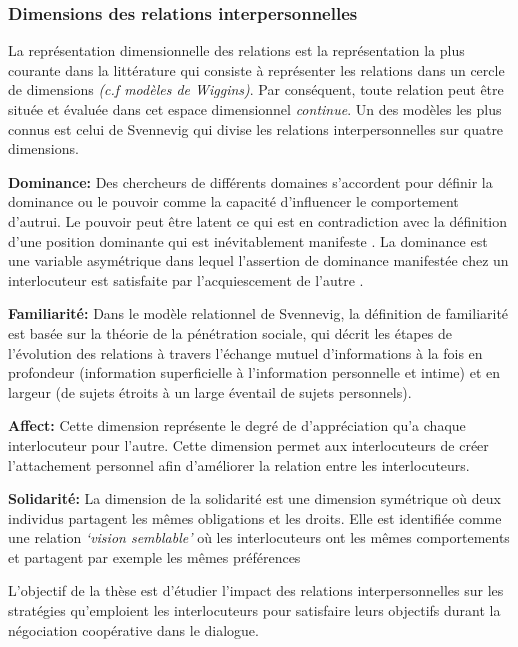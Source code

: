 \documentclass[a4paper,french]{article}
\begin{document}
\subsubsection{Dimensions des relations interpersonnelles}
La représentation dimensionnelle des relations est la représentation la plus courante dans la littérature qui consiste à représenter les relations dans un cercle de dimensions \emph{(c.f modèles de Wiggins)}. Par conséquent, toute relation peut être située et évaluée dans cet espace dimensionnel \textit{continue}. Un des modèles les plus connus est celui de Svennevig \cite{svennevig2000getting} qui divise les relations interpersonnelles sur quatre dimensions. 
\par \textbf{Dominance:} Des chercheurs de différents domaines s'accordent pour définir la dominance ou le pouvoir comme la capacité d'influencer le comportement d'autrui. Le pouvoir peut être latent \cite{komter1989hidden} ce qui est en contradiction avec la définition d'une position dominante qui est inévitablement manifeste \cite{dunbar2005perceptions}. La dominance est une variable asymétrique dans lequel l'assertion de dominance manifestée chez un interlocuteur est satisfaite par l'acquiescement de l'autre \cite{rogers1979domineeringness}.

\par \textbf{Familiarité:} Dans le modèle relationnel de Svennevig, la définition de familiarité est basée sur la théorie de la pénétration sociale, qui décrit les étapes de l'évolution des relations à travers l'échange mutuel d'informations à la fois en profondeur (information superficielle à l'information personnelle et intime) et en largeur (de sujets étroits à un large éventail de sujets personnels).

\par \textbf{Affect:} Cette dimension représente le degré de d'appréciation qu'a chaque interlocuteur pour l'autre. Cette dimension permet aux interlocuteurs de créer l'attachement personnel afin d'améliorer la relation entre les interlocuteurs\cite{nicholson2001role}.
	
\par \textbf{Solidarité:} La dimension de la solidarité est une dimension symétrique où deux individus partagent les mêmes obligations et les droits. Elle est identifiée comme une  relation  \emph{‘vision semblable’} où les interlocuteurs ont les mêmes comportements et partagent par exemple les mêmes préférences

\par L'objectif de la thèse est d'étudier l'impact des relations interpersonnelles sur les stratégies qu'emploient les interlocuteurs pour satisfaire leurs objectifs durant la négociation coopérative dans le dialogue.
\end{document}
